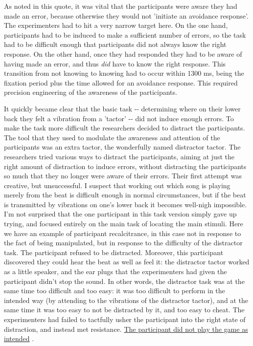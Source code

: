 \documentclass[twocolumn, serif, authordate, review]{jote-article}
\begin{document}
As noted in this quote, it was vital that the participants were aware they had made an error, because otherwise they would not 'initiate an avoidance response'. The experimenters had to hit a very narrow target here. On the one hand, participants had to be induced to make a sufficient number of errors, so the task had to be difficult enough that participants did not always know the right response. On the other hand, once they had responded they had to be aware of having made an error, and thus \textit{did} have to know the right response. This transition from not knowing to knowing had to occur within 1300 ms, being the fixation period plus the time allowed for an avoidance response. This required precision engineering of the awareness of the participants.

It quickly became clear that the basic task -{}- determining where on their lower back they felt a vibration from a 'tactor' -{}- did not induce enough errors. To make the task more difficult the researchers decided to distract the participants. The tool that they used to modulate the awareness and attention of the participants was an extra tactor, the wonderfully named distractor tactor. The researchers tried various ways to distract the participants, aiming at just the right amount of distraction to induce errors, without distracting the participants so much that they no longer were aware of their errors. Their first attempt was creative, but unsuccessful. I suspect that working out which song is playing merely from the beat is difficult enough in normal circumstances, but if the beat is transmitted by vibrations on one's lower back it becomes well-nigh impossible. I'm not surprised that the one participant in this task version simply gave up trying, and focused entirely on the main task of locating the main stimuli. Here we have an example of participant recalcitrance, in this case not in response to the fact of being manipulated, but in response to the difficulty of the distractor task. The participant refused to be distracted. Moreover, this participant discovered they could hear the beat as well as feel it: the distractor tactor worked as a little speaker, and the ear plugs that the experimenters had given the participant didn't stop the sound. In other words, the distractor task was at the same time too difficult and too easy: it was too difficult to perform in the intended way (by attending to the vibrations of the distractor tactor), and at the same time it was too easy to not be distracted by it, and too easy to cheat. The experimenters had failed to tactfully usher the participant into the right state of distraction, and instead met resistance. \hyperref[sec:reviews]{The participant did not play the game as intended} \label{sec:game}.
\end{document}
